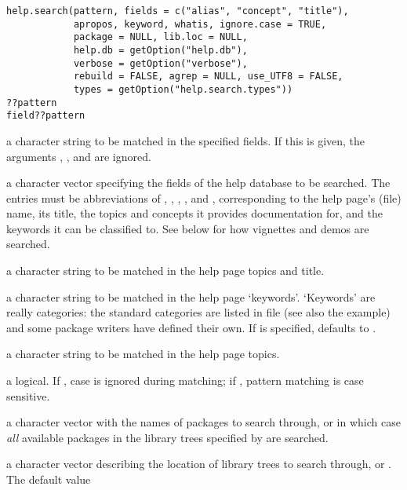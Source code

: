 %
\begin{Usage}
\begin{verbatim}
help.search(pattern, fields = c("alias", "concept", "title"),
            apropos, keyword, whatis, ignore.case = TRUE,
            package = NULL, lib.loc = NULL,
            help.db = getOption("help.db"),
            verbose = getOption("verbose"),
            rebuild = FALSE, agrep = NULL, use_UTF8 = FALSE,
            types = getOption("help.search.types"))
??pattern
field??pattern
\end{verbatim}
\end{Usage}
%
\begin{Arguments}
\begin{ldescription}
\item[\code{pattern}] a character string to be matched in the specified
fields.  If this is given, the arguments ,
, and  are ignored.
\item[\code{fields}] a character vector specifying the fields of the help
database to be searched.  The entries must be abbreviations of
, , , , and
, corresponding to the help page's (file) name, its
title, the topics and concepts it provides documentation for, and
the keywords it can be classified to.  See below for how vignettes
and demos are searched.
\item[\code{apropos}] a character string to be matched in the help page
topics and title.
\item[\code{keyword}] a character string to be matched in the help page
`keywords'. `Keywords' are really categories: the
standard categories are listed in file 
(see also the example) and some package writers have defined their
own.  If  is specified,  defaults to
. \item[\code{whatis}] a character string to be matched in
the help page topics.
\item[\code{ignore.case}] a logical.  If , case is ignored during
matching; if , pattern matching is case sensitive.
\item[\code{package}] a character vector with the names of packages to
search through, or  in which case \emph{all} available
packages in the library trees specified by  are
searched.
\item[\code{lib.loc}] a character vector describing the location of \R{}
library trees to search through, or .  The default value

\end{ldescription}
\end{Arguments}
